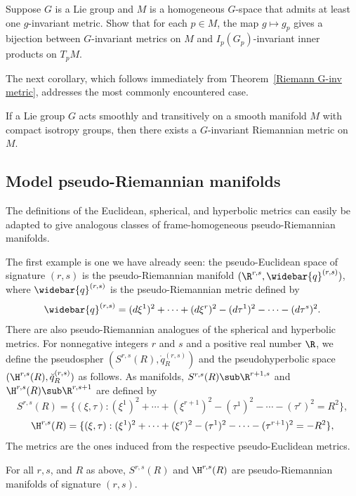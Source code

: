 \begin{corollary}
Suppose $G$ is a Lie group and $M$ is a homogeneous $G$-space that admits at least one 
$g$-invariant metric. Show that for each $p\in M$, the map $g\mapsto g_p$ gives a bijection 
between $G$-invariant metrics on $M$ and $I_p(G_p)$-invariant inner products on $T_pM$.
\end{corollary}
The next corollary, which follows immediately from Theorem~\ref{Riemann G-inv metric}, addresses
the most commonly encountered case.
\begin{corollary}\label{Riemann metric G-inv if isotopy}
If a Lie group $G$ acts smoothly and transitively on a smooth manifold $M$ with compact isotropy 
groups, then there exists a $G$-invariant Riemannian metric on $M$.
\end{corollary}
\subsection{Model pseudo-Riemannian manifolds}
The definitions of the Euclidean, spherical, and hyperbolic metrics can easily be adapted to 
give analogous classes of frame-homogeneous pseudo-Riemannian manifolds.\par
The first example is one we have already seen: the pseudo-Euclidean space of signature $(r,s)$ 
is the pseudo-Riemannian manifold $(\R^{r,s},\widebar{q}^{(r,s)})$, where $\widebar{q}^{(r,s)}$ is the 
pseudo-Riemannian metric defined by
\[\widebar{q}^{(r,s)}=(d\xi^1)^2+\cdots+(d\xi^r)^2-(d\tau^1)^2-\cdots-(d\tau^s)^2.\]
There are also pseudo-Riemannian analogues of the spherical and hyperbolic metrics. For 
nonnegative integers $r$ and $s$ and a positive real number $\R$, we define the pseudospher 
$(S^{r,s}(R),\mathring{q}^{(r,s)}_R)$ and the pseudohyperbolic space $(\H^{r,s}(R),\breve{q}^{(r,s)}_R)$ as
follows. As manifolds, $S^{r,s}(R)\sub\R^{r+1,s}$ and $\H^{r,s}(R)\sub\R^{r,s+1}$ are defined by
\[S^{r,s}(R)=\{(\xi,\tau):(\xi^1)^2+\cdots+(\xi^{r+1})^2-(\tau^1)^2-\cdots-(\tau^r)^2=R^2\},\]
\[\H^{r,s}(R)=\{(\xi,\tau):(\xi^1)^2+\cdots+(\xi^{r})^2-(\tau^1)^2-\cdots-(\tau^{r+1})^2=-R^2\},\]
The metrics are the ones induced from the respective pseudo-Euclidean metrics.
\begin{theorem}
For all $r,s$, and $R$ as above, $S^{r,s}(R)$ and $\H^{r,s}(R)$ are pseudo-Riemannian manifolds 
of signature $(r,s)$.
\end{theorem}
